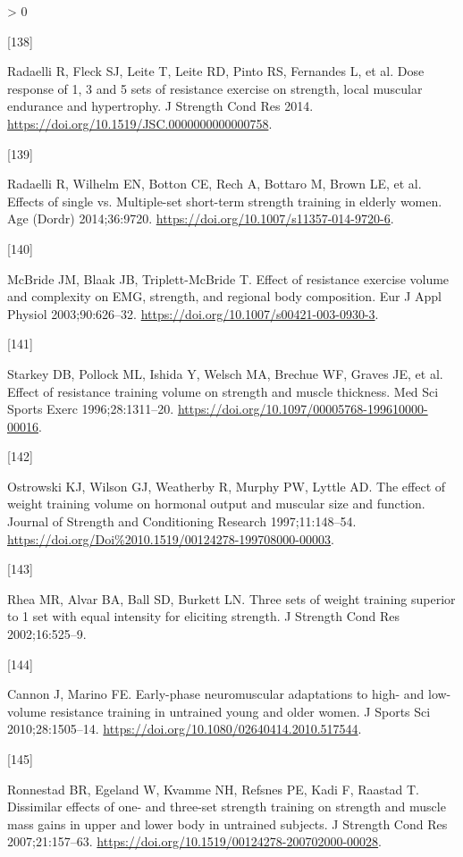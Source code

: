 \documentclass[twoside,10pt]{gihclass} %
\newlength{\cslhangindent}
\newlength{\csllabelwidth}
\newenvironment{CSLReferences}[3] %
 {%
  \setlength{\parindent}{0pt}
  \ifodd #1 \everypar{\setlength{\hangindent}{\cslhangindent}}\ignorespaces\fi
  \ifnum #2 > 0
  \setlength{\parskip}{#2\baselineskip}
  \fi
 }%
 {}
\newcommand{\CSLLeftMargin}[1]{\parbox[t]{\maxof{\widthof{#1}}{\csllabelwidth}}{#1}}
\newcommand{\CSLRightInline}[1]{\parbox[t]{\linewidth}{#1}}
\begin{document}
\begin{CSLReferences}{0}{0}
\leavevmode\hypertarget{ref-RN1570}{}%
\CSLLeftMargin{{[}138{]} }
\CSLRightInline{Radaelli R, Fleck SJ, Leite T, Leite RD, Pinto RS, Fernandes L, et al. Dose response of 1, 3 and 5 sets of resistance exercise on strength, local muscular endurance and hypertrophy. J Strength Cond Res 2014. \url{https://doi.org/10.1519/JSC.0000000000000758}.}

\leavevmode\hypertarget{ref-RN1518}{}%
\CSLLeftMargin{{[}139{]} }
\CSLRightInline{Radaelli R, Wilhelm EN, Botton CE, Rech A, Bottaro M, Brown LE, et al. Effects of single vs. Multiple-set short-term strength training in elderly women. Age (Dordr) 2014;36:9720. \url{https://doi.org/10.1007/s11357-014-9720-6}.}

\leavevmode\hypertarget{ref-RN1474}{}%
\CSLLeftMargin{{[}140{]} }
\CSLRightInline{McBride JM, Blaak JB, Triplett-McBride T. Effect of resistance exercise volume and complexity on EMG, strength, and regional body composition. Eur J Appl Physiol 2003;90:626--32. \url{https://doi.org/10.1007/s00421-003-0930-3}.}

\leavevmode\hypertarget{ref-RN1456}{}%
\CSLLeftMargin{{[}141{]} }
\CSLRightInline{Starkey DB, Pollock ML, Ishida Y, Welsch MA, Brechue WF, Graves JE, et al. Effect of resistance training volume on strength and muscle thickness. Med Sci Sports Exerc 1996;28:1311--20. \url{https://doi.org/10.1097/00005768-199610000-00016}.}

\leavevmode\hypertarget{ref-RN1454}{}%
\CSLLeftMargin{{[}142{]} }
\CSLRightInline{Ostrowski KJ, Wilson GJ, Weatherby R, Murphy PW, Lyttle AD. The effect of weight training volume on hormonal output and muscular size and function. Journal of Strength and Conditioning Research 1997;11:148--54. \url{https://doi.org/Doi\%2010.1519/00124278-199708000-00003}.}

\leavevmode\hypertarget{ref-RN1384}{}%
\CSLLeftMargin{{[}143{]} }
\CSLRightInline{Rhea MR, Alvar BA, Ball SD, Burkett LN. Three sets of weight training superior to 1 set with equal intensity for eliciting strength. J Strength Cond Res 2002;16:525--9.}

\leavevmode\hypertarget{ref-RN1382}{}%
\CSLLeftMargin{{[}144{]} }
\CSLRightInline{Cannon J, Marino FE. Early-phase neuromuscular adaptations to high- and low-volume resistance training in untrained young and older women. J Sports Sci 2010;28:1505--14. \url{https://doi.org/10.1080/02640414.2010.517544}.}

\leavevmode\hypertarget{ref-RN776}{}%
\CSLLeftMargin{{[}145{]} }
\CSLRightInline{Ronnestad BR, Egeland W, Kvamme NH, Refsnes PE, Kadi F, Raastad T. Dissimilar effects of one- and three-set strength training on strength and muscle mass gains in upper and lower body in untrained subjects. J Strength Cond Res 2007;21:157--63. \url{https://doi.org/10.1519/00124278-200702000-00028}.}


\end{CSLReferences}
\end{document}
